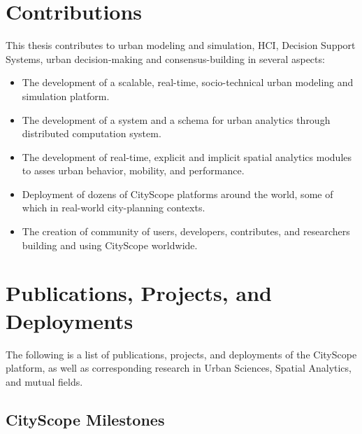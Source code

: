 \section{Contributions}
 {
  This thesis contributes to urban modeling and simulation, HCI, Decision Support Systems, urban decision-making and consensus-building in several aspects:

  \begin{itemize}
        \item The development of a scalable, real-time, socio-technical urban modeling and simulation platform.
        \item The development of a system and a schema for urban analytics through distributed computation system.
        \item The development of real-time, explicit and implicit spatial analytics modules to asses urban behavior, mobility, and performance.
        \item Deployment of dozens of CityScope platforms around the world, some of which in real-world city-planning contexts.
        \item The creation of community of users, developers, contributes, and researchers building and using CityScope worldwide.
  \end{itemize}
 }

\section{Publications, Projects, and Deployments}\label{sec:publications-projects-deployments}

{
      The following is a list of publications, projects, and deployments of the CityScope platform, as well as corresponding research in Urban Sciences, Spatial Analytics, and mutual fields.


      


      
}



\subsection{CityScope Milestones}


